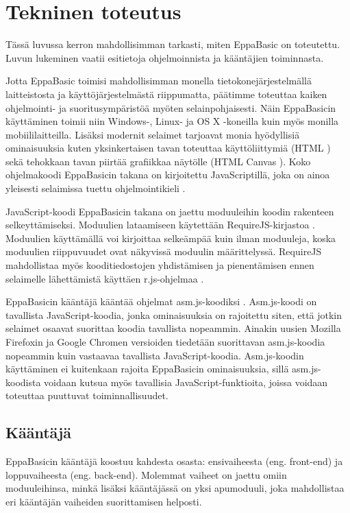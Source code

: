 
\section{Tekninen toteutus}

Tässä luvussa kerron mahdollisimman tarkasti,
miten EppaBasic on toteutettu.
Luvun lukeminen vaatii esitietoja
ohjelmoinnista ja kääntäjien toiminnasta.

Jotta EppaBasic toimisi mahdollisimman monella
tietokonejärjestelmällä laitteistosta ja
käyttöjärjestelmästä riippumatta,
päätimme toteuttaa kaiken ohjelmointi-
ja suoritusympäristöä myöten
selainpohjaisesti.
Näin EppaBasicin käyttäminen toimii niin
Windows-, Linux- ja OS X -koneilla
kuin myös monilla mobiililaitteilla.
Lisäksi modernit selaimet tarjoavat
monia hyödyllisiä ominaisuuksia
kuten yksinkertaisen tavan toteuttaa
käyttöliittymiä (HTML \cite{w3c_html})
sekä tehokkaan tavan piirtää grafiikkaa
näytölle (HTML Canvas \cite{mdn_canvas}).
Koko ohjelmakoodi EppaBasicin takana
on kirjoitettu JavaScriptillä,
joka on ainoa yleisesti selaimissa
tuettu ohjelmointikieli \cite{mdn_about_js}.

JavaScript-koodi EppaBasicin takana
on jaettu moduuleihin koodin
rakenteen selkeyttämiseksi.
Moduulien lataamiseen käytettään
RequireJS-kirjastoa \cite{requirejs}.
Moduulien käyttämällä voi kirjoittaa
selkeämpää kuin ilman moduuleja,
koska moduulien riippuvuudet ovat
näkyvissä moduulin määrittelyssä.
RequireJS mahdollistaa myös kooditiedostojen
yhdistämisen ja pienentämisen ennen selaimelle
lähettämistä käyttäen r.js-ohjelmaa \cite{r.js}.

EppaBasicin kääntäjä kääntää ohjelmat
asm.js-koodiksi \cite{asm.js}.
Asm.js-koodi on tavallista
JavaScript-koodia, jonka
ominaisuuksia on rajoitettu siten,
että jotkin selaimet osaavat
suorittaa koodia tavallista
nopeammin.
Ainakin uusien Mozilla Firefoxin
ja Google Chromen versioiden
tiedetään suorittavan
asm.js-koodia nopeammin
kuin vastaavaa tavallista
JavaScript-koodia.
Asm.js-koodin käyttäminen
ei kuitenkaan rajoita
EppaBasicin ominaisuuksia,
sillä asm.js-koodista
voidaan kutsua myös
tavallisia JavaScript-funktioita,
joissa voidaan toteuttaa
puuttuvat toiminnallisuudet.


\subsection{Kääntäjä}
EppaBasicin kääntäjä koostuu kahdesta osasta:
ensivaiheesta (eng. front-end) ja
loppuvaiheesta (eng. back-end).
Molemmat vaiheet on jaettu omiin moduuleihinsa,
minkä lisäksi kääntäjässä on yksi apumoduuli,
joka mahdollistaa eri kääntäjän vaiheiden
suorittamisen helposti.

